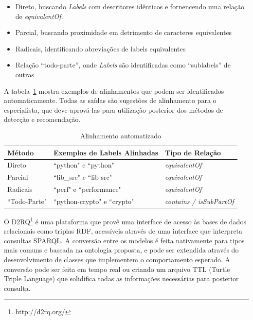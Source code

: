 \documentclass[sigconf]{acmart}
\begin{document}
\begin{itemize}
  \item Direto, buscando \textit{Labels} com descritores idênticos e fornencendo uma relação de \textit{equivalentOf}.
  \item Parcial, buscando proximidade em detrimento de caracteres equivalentes
  \item Radicais, identificando abreviações de labels equivalentes
  \item Relação ``todo-parte'', onde \textit{Labels} são identificadas como ``sublabels'' de outras
\end{itemize}

A tabela~\ref{tab:matching} mostra exemplos de alinhamentos que podem ser identificados automaticamente. Todas as saídas são sugestões de alinhamento para o especialista, que deve aprová-las para utilização posterior dos métodos de detecção e recomendação.

\begin{table}[!h]
  \centering
\begin{tabular}{@{}|l|l|l|@{}}
\hline
Método       & Exemplos de Labels Alinhadas           & Tipo de Relação                 \\ \hline
Direto       & ``python" e ``python"        & \textit{equivalentOf}           \\
Parcial      & ``lib\_src" e ``lib-src"     & \textit{equivalentOf}           \\
Radicais     & ``perf" e ``performance"     & \textit{equivalentOf}           \\
``Todo-Parte" & ``python-crypto" e ``crypto" & \textit{contains / isSubPartOf} \\ \hline
\end{tabular}
\caption{Alinhamento automatizado}\label{tab:matching}
\end{table}

O D2RQ\footnote{http://d2rq.org/} é uma plataforma que provê uma interface de acesso às bases de dados relacionais como triplas RDF, acessíveis através de uma interface que interpreta consultas SPARQL. A conversão entre os modelos é feita nativamente para tipos mais comuns e baseada na ontologia proposta, e pode ser extendida através do desenvolvimento de classes que implementem o comportamento esperado. A conversão pode ser feita em tempo real ou criando um arquivo TTL (Turtle Triple Language) que solidifica todas as informações necessárias para posterior consulta.
\end{document}
